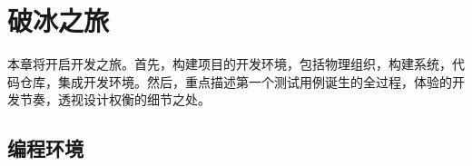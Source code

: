 \begin{savequote}[45mm]
\end{savequote}

\chapter{破冰之旅} 
\label{ch:ice-breaker}

\begin{content}

本章将开启开发之旅。首先，构建项目的开发环境，包括物理组织，构建系统，代码仓库，集成开发环境。然后，重点描述第一个测试用例诞生的全过程，体验的开发节奏，透视设计权衡的细节之处。


\end{content}

\section{编程环境}

